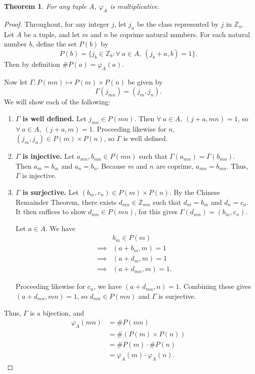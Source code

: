 \documentclass[11pt, leqno]{article}
\newtheorem{theorem}{Theorem}[section]
\begin{document}
\begin{theorem}\label{phi multiplicative}
    For any tuple $A$, $\varphi_A$ is multiplicative.
\end{theorem}
\begin{proof}
    Throughout, for any integer $j$, let $j_n$ be the class represented 
    by $j$ in $\mathbb{Z}_n$.
    Let $A$ be a tuple, 
    and let $m$ and $n$ be coprime natural numbers.
    For each natural number $b$, define the set $P(b)$ by
    $$P(b) = \{j_b\in\mathbb{Z}_b : \forall\ a \in A,\ (j_b+a,b) = 1 \}.$$
    Then by definition $\#P(a)=\varphi_A(a)$. 

    Now let $\Gamma: P(mn) \longmapsto P(m)\times P(n)$ be given by
    $$\Gamma(j_{mn}) = (j_m, j_n).$$
    We will show each of the following:

    \begin{enumerate}
        \item \textbf{$\Gamma$ is well defined.}
            Let $j_{mn}\in P(mn)$.
            Then $\forall\ a\in A,\ (j+a,mn) = 1$, so
            $\forall\ a\in A,\ (j+a,m) = 1$.
            Proceeding likewise for $n$, $(j_m, j_n) \in P(m)\times P(n)$,
            so $\Gamma$ is well defined.

        \item \textbf{$\Gamma$ is injective.}
            Let $a_{mn},b_{mn}\in P(mn)$ such that $\Gamma(a_{mn})=\Gamma(b_{mn})$.
            Then $a_m = b_m$ and $a_n = b_n$. 
            Because $m$ and $n$ are coprime, $a_{mn} = b_{mn}$.
            Thus, $\Gamma$ is injective.
            
        \item \textbf{$\Gamma$ is surjective.}
            Let $(b_m,c_n)\in P(m)\times P(n)$.
            By the Chinese Remainder Theorem, there exists $d_{mn}\in\mathbb{Z}_{mn}$
            such that $d_m=b_m$ and $d_n=c_n$.
            It then suffices to show $d_{mn}\in P(mn)$, for this gives
            $\Gamma(d_{mn}) = (b_m,c_n)$.

            Let $a\in A$. 
            We have
            \begin{align*}
                & b_m\in P(m) \\
                \implies& (a+b_m,m) = 1 \\
                \implies& (a+d_m,m) = 1 \\
                \implies& (a+d_{mn},m) = 1.
            \end{align*}
            
            Proceeding likewise for $c_n$, we have $(a+d_{mn},n) = 1$.
            Combining these gives $(a+d_{mn},mn) = 1$, so 
            $d_{mn}\in P(mn)$ and $\Gamma$ is surjective.
    \end{enumerate}

    Thus, $\Gamma$ is a bijection, and
    \begin{align*}
    \varphi_A(mn)
    &=\#P(mn) \\
    &=\#(P(m)\times P(n)) \\
    &=\#P(m) \cdot \#P(n) \\
    &=\varphi_A(m)\cdot\varphi_A(n).
    \end{align*}
\end{proof}
\end{document}
